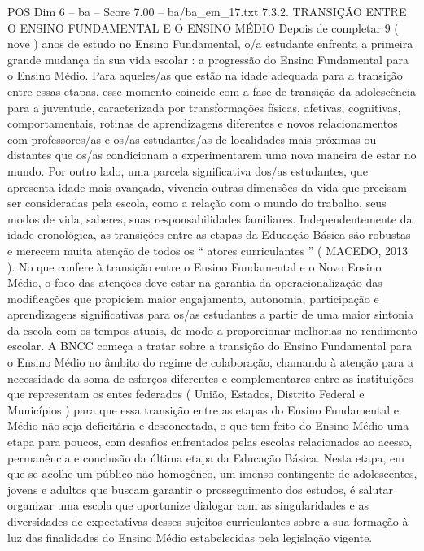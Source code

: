 \begin{textsample}{POS Dim 6 – ba – Score 7.00 – ba/ba\_em\_17.txt}  \label{ex:f6_pos_080}
7.3.2.
TRANSIÇÃO ENTRE O ENSINO FUNDAMENTAL E O ENSINO MÉDIO Depois de completar 9 ( nove ) anos de estudo no Ensino Fundamental, o/a estudante enfrenta a primeira grande mudança da sua vida escolar : a progressão do Ensino Fundamental para o Ensino Médio.
Para aqueles/as que estão na idade adequada para a transição entre essas etapas, esse momento coincide com a fase de transição da adolescência para a juventude, caracterizada por transformações físicas, afetivas, cognitivas, comportamentais, rotinas de aprendizagens diferentes e novos relacionamentos com professores/as e os/as estudantes/as de localidades mais próximas ou distantes que os/as condicionam a experimentarem uma nova maneira de estar no mundo.
Por outro lado, uma parcela significativa dos/as estudantes, que apresenta idade mais avançada, vivencia outras dimensões da vida que precisam ser consideradas pela escola, como a relação com o mundo do trabalho, seus modos de vida, saberes, suas responsabilidades familiares.
Independentemente da idade cronológica, as transições entre as etapas da Educação Básica são robustas e merecem muita atenção de todos os “ atores curriculantes ” ( MACEDO, 2013 ).
No que confere à transição entre o Ensino Fundamental e o Novo Ensino Médio, o foco das atenções deve estar na garantia da operacionalização das modificações que propiciem maior engajamento, autonomia, participação e aprendizagens significativas para os/as estudantes a partir de uma maior sintonia da escola com os tempos atuais, de modo a proporcionar melhorias no rendimento escolar.
A BNCC começa a tratar sobre a transição do Ensino Fundamental para o Ensino Médio no âmbito do regime de colaboração, chamando à atenção para a necessidade da soma de esforços diferentes e complementares entre as instituições que representam os entes federados ( União, Estados, Distrito Federal e Municípios ) para que essa transição entre as etapas do Ensino Fundamental e Médio não seja deficitária e desconectada, o que tem feito do Ensino Médio uma etapa para poucos, com desafios enfrentados pelas escolas relacionados ao acesso, permanência e conclusão da última etapa da Educação Básica.
Nesta etapa, em que se acolhe um público não homogêneo, um imenso contingente de adolescentes, jovens e adultos que buscam garantir o prosseguimento dos estudos, é salutar organizar uma escola que oportunize dialogar com as singularidades e as diversidades de expectativas desses sujeitos curriculantes sobre a sua formação à luz das finalidades do Ensino Médio estabelecidas pela legislação vigente.

\end{textsample}
